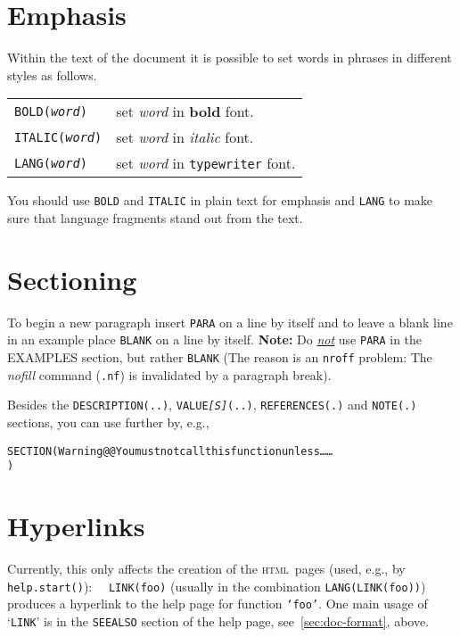 \documentclass[a4paper,11pt]{article}
\newenvironment{display}[0]%
 {\begin{list}{}{\setlength{\leftmargin}{30pt}}\item}%
 {\end{list}}
\newcommand{\HTML}{\textsc{html}}
\begin{document}
\section{Emphasis}
Within the text of the document it is possible to set
words in phrases in different styles as follows.
\begin{center}
\begin{tabular}{ll}
\texttt{BOLD(\textit{word})}   & set \emph{word} in \textbf{bold} font. \\
\texttt{ITALIC(\textit{word})} & set \emph{word} in \textit{italic} font. \\
\texttt{LANG(\textit{word})}   & set \emph{word} in \texttt{typewriter} font. \\
\end{tabular}
\end{center}
You should use \texttt{BOLD} and \texttt{ITALIC} in plain text for emphasis
and \texttt{LANG} to make sure that language fragments stand out from the
text.

\section{Sectioning}
To begin a new paragraph insert \texttt{PARA} on a line by itself
and to leave a blank line in an example place \texttt{BLANK}
on a line by itself.
\textbf{Note:} Do \underline{\emph{not}} use
\texttt{PARA} in the \textsc{EXAMPLES} section, but rather \texttt{BLANK}
({\footnotesize The reason is an \texttt{nroff} problem: The \emph{nofill}
  command (\texttt{.nf}) is invalidated by a paragraph break}).

Besides the \texttt{DESCRIPTION(..)}, \texttt{VALUE\textit{[S]}(..)},
\texttt{REFERENCES(.)} and \texttt{NOTE(.)} sections, you can use further
by, e.g.,
\begin{display}
\begin{alltt}
SECTION(Warning @@  You must not call this function unless \ldots\ldots
)
\end{alltt}
\end{display}

\section{Hyperlinks}
Currently, this only affects the creation of the \HTML\ pages (used, e.g.,
by \texttt{help.start()}): \ \
\texttt{LINK(foo)} (usually in the combination \texttt{LANG(LINK(foo))})
produces a hyperlink to the help page for function
\texttt{`foo'}.
One main usage of  `\texttt{LINK}' is in the \texttt{SEEALSO} section of
the help page, see~\ref{sec:doc-format}, above.
\end{document}
